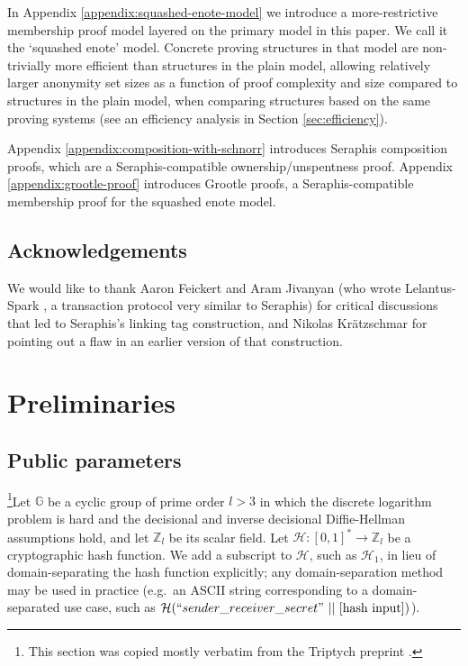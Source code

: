 In Appendix \ref{appendix:squashed-enote-model} we introduce a more-restrictive membership proof model layered on the primary model in this paper. We call it the `squashed enote' model. Concrete proving structures in that model are non-trivially more efficient than structures in the plain model, allowing relatively larger anonymity set sizes as a function of proof complexity and size compared to structures in the plain model, when comparing structures based on the same proving systems (see an efficiency analysis in Section \ref{sec:efficiency}).

Appendix \ref{appendix:composition-with-schnorr} introduces Seraphis composition proofs, which are a Seraphis-compatible ownership/unspentness proof. Appendix \ref{appendix:grootle-proof} introduces Grootle proofs, a Seraphis-compatible membership proof for the squashed enote model.



\subsection{Acknowledgements}
\label{subsec:intro-acknowledgements}

We would like to thank Aaron Feickert and Aram Jivanyan (who wrote Lelantus-Spark \cite{lelantus-spark}, a transaction protocol very similar to Seraphis) for critical discussions that led to Seraphis's linking tag construction, and Nikolas Kr{\"{a}}tzschmar for pointing out a flaw in an earlier version of that construction.



\section{Preliminaries}
\label{sec:preliminaries}

\subsection{Public parameters}
\label{subsec:preliminaries-public-parameters}

\footnote{This section was copied mostly verbatim from the Triptych preprint \cite{triptych-preprint}.}Let $\mathbb{G}$ be a cyclic group of prime order $l > 3$ in which the discrete logarithm problem is hard and the decisional and inverse decisional Diffie-Hellman assumptions hold, and let $\mathbb{Z}_l$ be its scalar field. Let $\mathcal{H}: [0,1]^* \to \mathbb{Z}_l$ be a cryptographic hash function. We add a subscript to $\mathcal{H}$, such as $\mathcal{H}_1$, in lieu of domain-separating the hash function explicitly; any domain-separation method may be used in practice (e.g.\ an ASCII string corresponding to a domain-separated use case, such as $\mathcal{H}(``sender\_receiver\_secret"\ ||\ [\textrm{hash input}])$).

